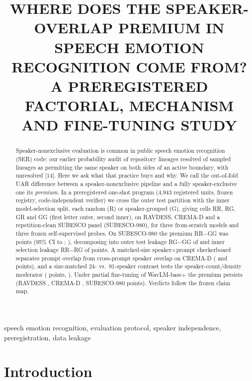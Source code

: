 \documentclass{article}
\title{WHERE DOES THE SPEAKER-OVERLAP PREMIUM IN SPEECH EMOTION RECOGNITION COME FROM?\\
A PREREGISTERED FACTORIAL, MECHANISM AND FINE-TUNING STUDY}
\begin{document}
\ninept
\maketitle

\begin{abstract}
Speaker-nonexclusive evaluation is common in public speech emotion recognition (SER) code: our earlier probability audit of \SOneFrameN{} repository lineages resolved \SOneYes{} of \SOneSampleN{} sampled lineages as permitting the same speaker on both sides of an active boundary, with \SOneUnknown{} unresolved [14].
Here we ask what that practice buys and why.
We call the out-of-fold UAR difference between a speaker-nonexclusive pipeline and a fully speaker-exclusive one its \emph{premium}.
In a preregistered one-shot program (4,943 registered units, frozen registry, code-independent verifier) we cross the outer test partition with the inner model-selection split, each random (R) or speaker-grouped (G), giving cells RR, RG, GR and GG (first letter outer, second inner), on RAVDESS, CREMA-D and a repetition-clean SUBESCO panel (SUBESCO-980), for three from-scratch models and three frozen self-supervised probes.
On SUBESCO-980 the premium RR$-$GG was \HNZeroOneMean{} points (95\% CI \HNZeroOneCILow{} to \HNZeroOneCIHigh; \HNZeroOneVerdict), decomposing into outer test leakage RG$-$GG of \HNZeroThreeMean{} and inner selection leakage RR$-$RG of \HNZeroFourMean{} points.
A matched-size speaker$\times$prompt checkerboard separates prompt overlap from cross-prompt speaker overlap on CREMA-D (\HNZeroFiveMean{} and \HNZeroSixMean{} points), and a size-matched 24- vs.\ 91-speaker contrast tests the speaker-count/density moderator (\HNOneZeroMean{} points, \HNOneZeroVerdict).
Under partial fine-tuning of WavLM-base+ the premium persists (RAVDESS \HRZeroNineMean, CREMA-D \HROneZeroMean, SUBESCO-980 \HROneOneMean{} points).
Verdicts follow the frozen claim map.
\end{abstract}

\begin{keywords}
speech emotion recognition, evaluation protocol, speaker independence, preregistration, data leakage
\end{keywords}

\section{Introduction}
\end{document}
